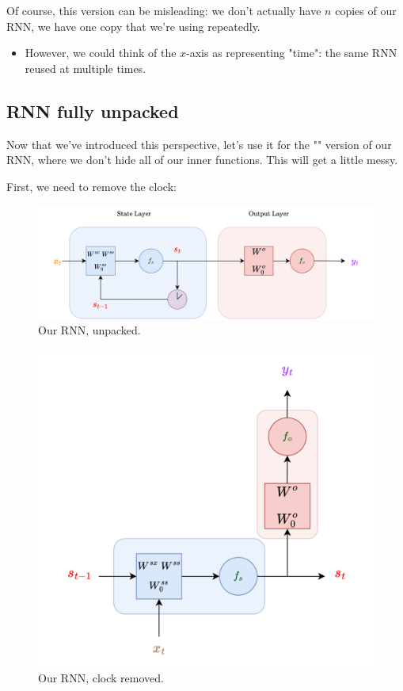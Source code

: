         Of course, this version can be misleading: we don't actually have $n$ copies of our RNN, we have one copy that we're using repeatedly.

        \begin{itemize}
            \item However, we could think of the $x$-axis as representing "time": the same RNN reused at multiple times.
        \end{itemize}




    \phantom{}

    \subsection{RNN fully unpacked}

        Now that we've introduced this perspective, let's use it for the "" version of our RNN, where we don't hide all of our inner functions. This will get a little messy.

        First, we need to remove the clock:

        \begin{figure}[H]
          \centering
          \includegraphics[width=\linewidth]{images/rnn_images/rnn_full.png}
          \caption*{Our RNN, unpacked.}
        \end{figure}

        \begin{figure}[H]
          \centering
          \includegraphics[width=.5\linewidth]{images/rnn_images/unrolled_rnn.png}
          \caption*{Our RNN, clock removed.}
        \end{figure}

